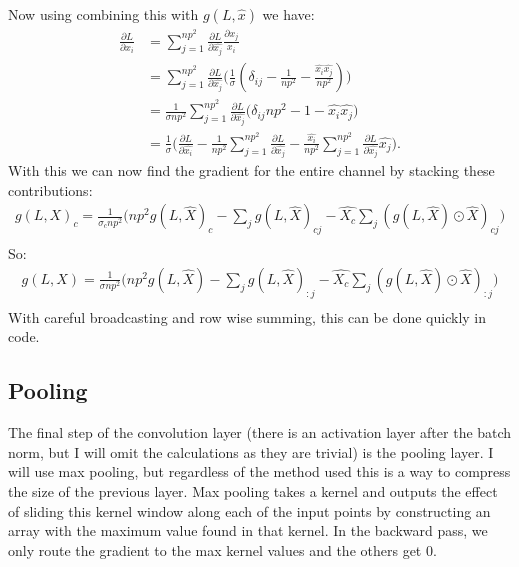 \documentclass[12pt]{article}
\begin{document}
Now using combining this with $g(L, \hat{x})$ we have:
\begin{align*}
    \frac{\partial L}{\partial x_i} &= \sum_{j = 1}^{np^2} \frac{\partial L}{\partial \hat{x_j}} \frac{\partial \hat{x_j}}{x_i} \\
    &= \sum_{j = 1}^{np^2} \frac{\partial L}{\partial \hat{x_j}} \Big(\frac{1}{\sigma}(\delta_{ij} - \frac{1}{np^2} - \frac{\hat{x_i}\hat{x_j}}{np^2})\Big) \\
    &= \frac{1}{\sigma np^2} \sum_{j = 1}^{np^2} \frac{\partial L}{\partial \hat{x_j}} \Big(\delta_{ij}np^2 - 1 - \hat{x_i}\hat{x_j}) \\
    &= \frac{1}{\sigma}\Big(\frac{\partial L}{\partial \hat{x_i}}- \frac{1}{np^2}\sum_{j = 1}^{np^2} \frac{\partial L}{\partial \hat{x_j}} - \frac{\hat{x_i}}{np^2}\sum_{j = 1}^{np^2} \frac{\partial L}{\partial \hat{x_j}}\hat{x_j}\Big).
\end{align*}
With this we can now find the gradient for the entire channel by stacking
these contributions:
\begin{align*}
    g(L, X)_c = \frac{1}{\sigma_c np^2}\Big(np^2g(L, \hat{X})_c - \sum_{j}g(L, \hat{X})_{cj} - \hat{X_c}\sum_{j}(g(L, \hat{X}) \odot \hat{X})_{cj}\Big) \\
\end{align*}
So:
\begin{align*}
    g(L, X) = \frac{1}{\sigma np^2}\Big(np^2g(L, \hat{X}) - \sum_{j}g(L, \hat{X})_{:j} - \hat{X_c}\sum_{j}(g(L, \hat{X}) \odot \hat{X})_{:j}\Big) \\
\end{align*}
With careful broadcasting and row wise summing, this can be done quickly in code.

\subsection*{Pooling}
The final step of the convolution layer (there is an activation layer after the batch norm, but I will
omit the calculations as they are trivial) is the pooling layer. I will use max pooling,
but regardless of the method used this is a way to compress the size of the previous layer. Max pooling
takes a kernel and outputs the effect of sliding this kernel window along each of the input points
by constructing an array with the maximum value found in that kernel. In the backward pass, we only route
the gradient to the max kernel values and the others get 0.
\end{document}
